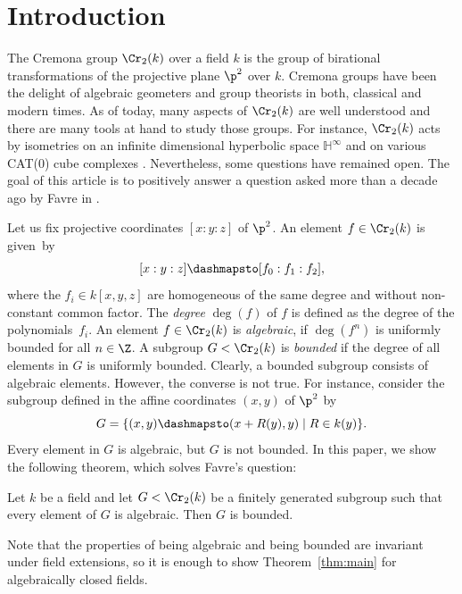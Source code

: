 \section{Introduction}

The Cremona group $\Cr_2(k)$ over a field $k$ is the group of birational transformations of the projective plane $\p^2$ over $k$. Cremona groups have been the delight of algebraic geometers and group theorists in both, classical and modern times. As of today, many aspects of $\Cr_2(k)$ are well understood and there are many tools at hand to study those groups. For instance, $\Cr_2(k)$ acts by isometries on an infinite dimensional hyperbolic space $\mathbb{H}^\infty$ \cite{Cantat_groupes_birat} and on various CAT(0) cube complexes \cite{lonjou2021actions}. Nevertheless, some questions have remained open. The goal of this article is to positively answer a question asked more than a decade ago by Favre in \cite[Quest.\,1]{favrebourbaki}.

Let us fix projective coordinates $[x:y:z]$ of $\p^2$. An element $f\in\Cr_2(k)$ is given~by
\[
[x:y:z]\dashmapsto [f_0:f_1:f_2],
\]
where the $f_i\in k[x,y,z]$ are homogeneous of the same degree and without non-constant common factor. The \emph{degree} $\deg(f)$ of $f$ is defined as the degree of the polynomials~$f_i$. An element $f\in\Cr_2(k)$ is \emph{algebraic}, if $\deg(f^n)$ is uniformly bounded for all $n\in\Z$. A subgroup $G<\Cr_2(k)$ is \emph{bounded} if the degree of all elements in $G$ is uniformly bounded.
Clearly, a bounded subgroup consists of algebraic elements. However, the converse is not true. For instance, consider the subgroup defined in the affine coordinates $(x,y)$ of $\p^2$ by
\[
G=\{(x,y)\dashmapsto (x+R(y), y)\mid R\in k(y)\}.
\]
Every element in $G$ is algebraic, but $G$ is not bounded. In this paper, we show the following theorem, which solves Favre's question:

\begin{theorem}\label{thm:main}
{Let $k$ be a field and} let $G<\Cr_2(k)$ be a finitely generated subgroup such that every element of $G$ is algebraic. Then $G$ is bounded.
\end{theorem}

\begin{remark}\label{rmk_alg_closed_fields}
Note that the properties of being algebraic and being bounded are invariant under field extensions, so it is enough to show Theorem~\ref{thm:main} for algebraically closed fields.
\end{remark}

